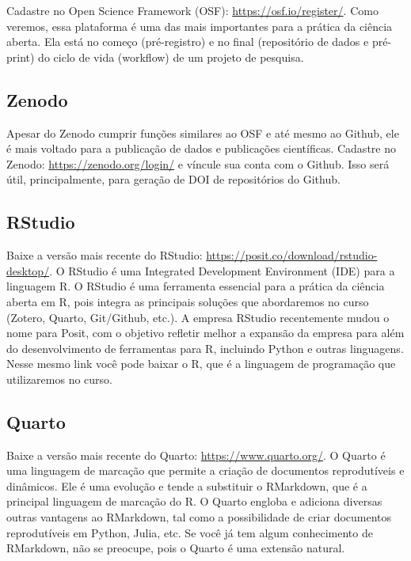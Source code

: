 \documentclass[
  a4paper,
]{article}
\begin{document}

Cadastre no Open Science Framework (OSF):
\url{https://osf.io/register/}. Como veremos, essa plataforma é uma das
mais importantes para a prática da ciência aberta. Ela está no começo
(pré-registro) e no final (repositório de dados e pré-print) do ciclo de
vida (workflow) de um projeto de pesquisa.

\subsection*{Zenodo}\label{sec-zenodoprework}


Apesar do Zenodo cumprir funções similares ao OSF e até mesmo ao Github,
ele é mais voltado para a publicação de dados e publicações científicas.
Cadastre no Zenodo: \url{https://zenodo.org/login/} e víncule sua conta
com o Github. Isso será útil, principalmente, para geração de DOI de
repositórios do Github.

\subsection*{RStudio}\label{sec-rstudioprework}


Baixe a versão mais recente do RStudio:
\url{https://posit.co/download/rstudio-desktop/}. O RStudio é uma
Integrated Development Environment (IDE) para a linguagem R. O RStudio é
uma ferramenta essencial para a prática da ciência aberta em R, pois
integra as principais soluções que abordaremos no curso (Zotero, Quarto,
Git/Github, etc.). A empresa RStudio recentemente mudou o nome para
Posit, com o objetivo refletir melhor a expansão da empresa para além do
desenvolvimento de ferramentas para R, incluindo Python e outras
linguagens. Nesse mesmo link você pode baixar o R, que é a linguagem de
programação que utilizaremos no curso.

\subsection*{Quarto}\label{sec-quartoprework}


Baixe a versão mais recente do Quarto: \url{https://www.quarto.org/}. O
Quarto é uma linguagem de marcação que permite a criação de documentos
reprodutíveis e dinâmicos. Ele é uma evolução e tende a substituir o
RMarkdown, que é a principal linguagem de marcação do R. O Quarto
engloba e adiciona diversas outras vantagens ao RMarkdown, tal como a
possibilidade de criar documentos reprodutíveis em Python, Julia, etc.
Se você já tem algum conhecimento de RMarkdown, não se preocupe, pois o
Quarto é uma extensão natural.
\end{document}
